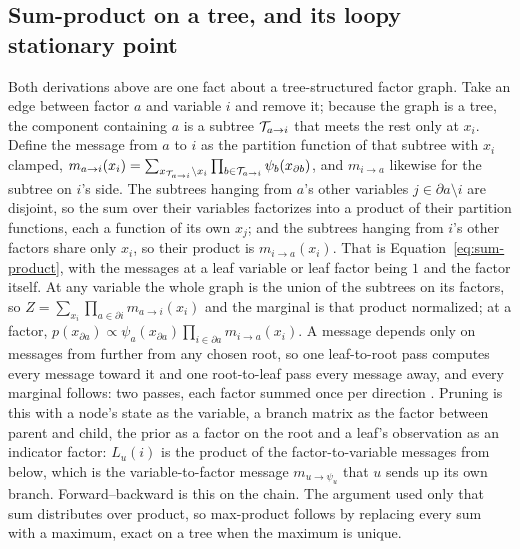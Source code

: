 \documentclass[11pt,a4paper]{article}
\begin{document}
\subsection{Sum-product on a tree, and its loopy stationary point}
\label{app:sum-product}
Both derivations above are one fact about a tree-structured factor graph.
Take an edge between factor $a$ and variable $i$ and remove it; because the
graph is a tree, the component containing $a$ is a subtree $\mathcal{T}_{a \to i}$
that meets the rest only at $x_i$. Define the message from $a$ to $i$ as the
partition function of that subtree with $x_i$ clamped,
$m_{a \to i}(x_i) = \sum_{x_{\mathcal{T}_{a \to i}} \setminus x_i}
\prod_{b \in \mathcal{T}_{a \to i}} \psi_b(x_{\partial b})$, and $m_{i \to a}$
likewise for the subtree on $i$'s side. The subtrees hanging from $a$'s other
variables $j \in \partial a \setminus i$ are disjoint, so the sum over their
variables factorizes into a product of their partition functions, each a
function of its own $x_j$; and the subtrees hanging from $i$'s other factors
share only $x_i$, so their product is $m_{i \to a}(x_i)$. That is
Equation~\ref{eq:sum-product}, with the messages at a leaf variable or leaf
factor being $1$ and the factor itself. At any variable the whole graph is
the union of the subtrees on its factors, so $Z = \sum_{x_i} \prod_{a \in
\partial i} m_{a \to i}(x_i)$ and the marginal is that product normalized;
at a factor, $p(x_{\partial a}) \propto \psi_a(x_{\partial a}) \prod_{i \in
\partial a} m_{i \to a}(x_i)$. A message depends only on messages from
further from any chosen root, so one leaf-to-root pass computes every message
toward it and one root-to-leaf pass every message away, and every marginal
follows: two passes, each factor summed once per direction
\citep{pearl1988, kschischang2001, koller2009}. Pruning is this with a node's
state as the variable, a branch matrix as the factor between parent and
child, the prior as a factor on the root and a leaf's observation as an
indicator factor: $L_u(i)$ is the product of the factor-to-variable messages
from below, which is the variable-to-factor message $m_{u \to \psi_u}$ that
$u$ sends up its own branch. Forward--backward is this on the chain. The
argument used only that sum distributes over product, so max-product follows
by replacing every sum with a maximum, exact on a tree when the maximum is
unique.
\end{document}
